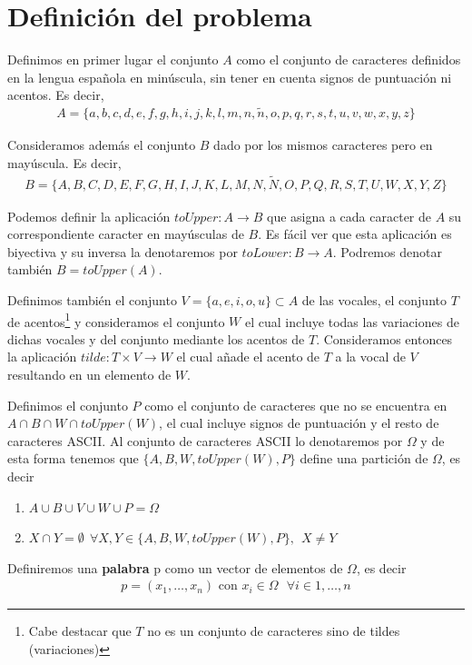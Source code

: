 \documentclass[12pt]{article}
\begin{document}
\section{Definición del problema}

Definimos en primer lugar el conjunto $A$ como el conjunto de caracteres definidos en la lengua española en minúscula, sin tener en cuenta signos de puntuación ni acentos. Es decir, 
\begin{gather*}
    A=\{a,b,c,d,e,f,g,h,i,j,k,l,m,n,\tilde{n},o,p,q,r,s,t,u,v,w,x,y,z\}
\end{gather*}

Consideramos además el conjunto $B$ dado por los mismos caracteres pero en mayúscula. Es decir, 
\begin{gather*}
    B=\{A,B,C,D,E,F,G,H,I,J,K,L,M,N,\tilde{N},O,P,Q,R,S,T,U,W,X,Y,Z\}
\end{gather*}

Podemos definir la aplicación $toUpper:A \to B$ que asigna a cada caracter de $A$ su correspondiente caracter en mayúsculas de $B$. Es fácil ver que esta aplicación es biyectiva y su inversa la denotaremos por $toLower: B \to A$. Podremos denotar también $B=toUpper(A)$.

Definimos también el conjunto $V=\{a,e,i,o,u\}\subset A$ de las vocales, el conjunto $T$ de acentos\footnote{Cabe destacar que $T$ no es un conjunto de caracteres sino de tildes (variaciones)} y consideramos el conjunto $W$ el cual incluye todas las variaciones de dichas vocales y del conjunto mediante los acentos de $T$. Consideramos entonces la aplicación $tilde: T \times V \to W$ el cual añade el acento de $T$ a la vocal de $V$ resultando en un elemento de $W$.

Definimos el conjunto $P$ como el conjunto de caracteres que no se encuentra en $A\cap B \cap W \cap toUpper(W)$, el cual incluye signos de puntuación y el resto de caracteres ASCII. Al conjunto de caracteres ASCII lo denotaremos por $\Omega$ y de esta forma tenemos que $\{A,B,W,toUpper(W),P\}$ define una partición de $\Omega$, es decir
\begin{enumerate}
    \item $A\cup B \cup V \cup W \cup P = \Omega$
    \item $X\cap Y = \emptyset\ \ \forall X,Y\in \{A,B,W,toUpper(W),P\},\ \  X\neq Y$
\end{enumerate}

Definiremos una \textbf{palabra} p como un vector de elementos de $\Omega$, es decir
\begin{gather*}
    p=(x_1,\dots,x_n) \text{ con } x_i\in \Omega \ \ \ \forall i\in 1,\dots,n
\end{gather*}
\end{document}
